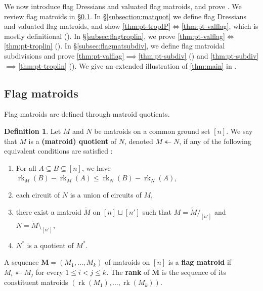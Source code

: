 \documentclass[11pt]{amsart}
\newcommand{\MM}{{\boldsymbol M}}
\theoremstyle{definition}
\newtheorem{defn}[thm]{Definition}
\begin{document}
We now introduce flag Dressians and valuated flag matroids, and prove .  We review flag matroids in \S \ref{subsec:flagmat}.  In \S \ref{subsection:matquot} we define flag Dressians and valuated flag matroids, and show \ref{thm:pt-tropIP}$\iff$\ref{thm:pt-valflag}, which is mostly definitional ().  In \S \ref{subsec:flagtroplin}, we prove \ref{thm:pt-valflag}$\iff$\ref{thm:pt-troplin} ().  In \S \ref{subsec:flagmatsubdiv}, we define flag matroidal subdivisions and prove \ref{thm:pt-valflag}$\implies$\ref{thm:pt-subdiv} () and \ref{thm:pt-subdiv}$\implies$\ref{thm:pt-troplin} (). We give an extended illustration of \cref{thm:main} in .

\subsection{Flag matroids}
\label{subsec:flagmat}

Flag matroids are defined through matroid quotients.

\begin{defn}
\label{defn:matroidquotient}
Let $M$ and $N$ be matroids on a common ground set $[n]$.  We say that $M$ is a \textbf{(matroid) quotient} of $N$, denoted $M \twoheadleftarrow N$, if any of the following equivalent conditions are satisfied \cite[Proposition 7.4.7]{Bry86}:
\begin{enumerate}
\item For all $A\subseteq B \subseteq [n]$, we have $\operatorname{rk}_{M}(B) -\operatorname{rk}_{M}(A) \leq \operatorname{rk}_N(B) - \operatorname{rk}_{N}(A) $,
\item each circuit of $N$ is a union of circuits of $M$,
\item there exist a matroid $\widetilde M$ on $[n]\sqcup [n']$ such that $M = \widetilde M/_{[n']}$ and $N = \widetilde M\setminus_{[n']}$,
\item $N^*$ is a quotient of ${M}^*$.
\end{enumerate}
A sequence $\MM = (M_1, \ldots, M_k)$ of matroids on $[n]$ is a \textbf{flag matroid} if $M_i \twoheadleftarrow M_j$ for every $1\leq i<j \leq k$.  The \textbf{rank} of $\MM$ is the sequence of its constituent matroids $(\operatorname{rk}(M_1), \ldots, \operatorname{rk}(M_k))$.
\end{defn}
\end{document}
